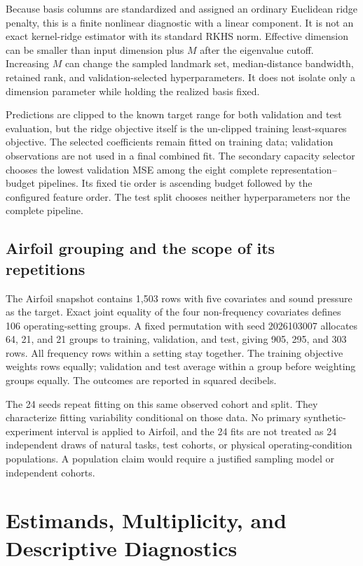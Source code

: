 Because basis columns are standardized and assigned an ordinary Euclidean
ridge penalty, this is a finite nonlinear diagnostic with a linear
component. It is not an exact kernel-ridge estimator with its standard
RKHS norm. Effective dimension can be smaller than input dimension
plus $M$ after the eigenvalue cutoff. Increasing $M$ can change the
sampled landmark set, median-distance bandwidth, retained rank, and
validation-selected hyperparameters. It does not isolate only a
dimension parameter while holding the realized basis fixed.

Predictions are clipped to the known target range for both validation
and test evaluation, but the ridge objective itself is the un-clipped
training least-squares objective. The selected coefficients remain
fitted on training data; validation observations are not used in a
final combined fit. The secondary capacity selector chooses the lowest
validation MSE among the eight complete representation--budget pipelines.
Its fixed tie order is ascending budget followed by the configured
feature order. The test split chooses neither hyperparameters nor
the complete pipeline.

\subsection{Airfoil grouping and the scope of its repetitions}

The Airfoil snapshot contains 1,503 rows with five covariates and sound
pressure as the target. Exact joint equality of the four non-frequency
covariates defines 106 operating-setting groups. A fixed permutation
with seed 2026103007 allocates 64, 21, and 21 groups to training,
validation, and test, giving 905, 295, and 303 rows. All frequency rows
within a setting stay together. The training objective weights rows
equally; validation and test average within a group before weighting
groups equally. The outcomes are reported in squared decibels.

The 24 seeds repeat fitting on this same observed cohort and split.
They characterize fitting variability conditional on those data.
No primary synthetic-experiment interval is applied to Airfoil, and
the 24 fits are not treated as 24 independent draws of natural tasks,
test cohorts, or physical operating-condition populations. A population
claim would require a justified sampling model or independent cohorts.

\section{Estimands, Multiplicity, and Descriptive Diagnostics}\label{app:statistics}

